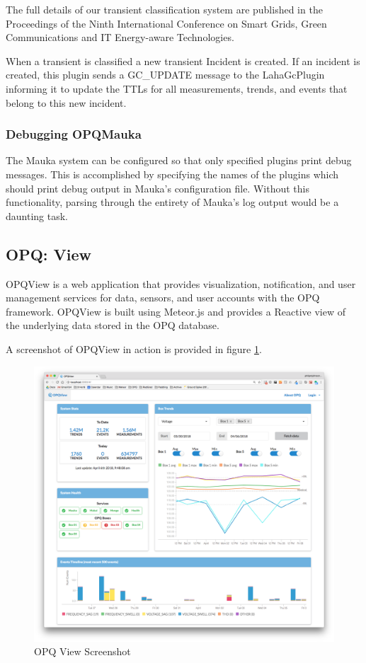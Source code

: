 The full details of our transient classification system are published in the Proceedings of the Ninth International Conference on Smart Grids, Green Communications and IT Energy-aware Technologies\cite{csdl2-19-02}.

When a transient is classified a new transient Incident is created. If an incident is created, this plugin sends a GC\_UPDATE message to the LahaGcPlugin informing it to update the TTLs for all measurements, trends, and events that belong to this new incident.

\subsubsection{Debugging OPQMauka}
The Mauka system can be configured so that only specified plugins print debug messages. This is accomplished by specifying the names of the plugins which should print debug output in Mauka's configuration file. Without this functionality, parsing through the entirety of Mauka's log output would be a daunting task.

\subsection{OPQ: View}
OPQView is a web application that provides visualization, notification, and user management services for data, sensors, and user accounts with the OPQ framework. OPQView is built using Meteor.js and provides a Reactive view of the underlying data stored in the OPQ database.

A screenshot of OPQView in action is provided in figure \ref{fig:opq-view}.

\begin{figure}
	\centering
	\includegraphics[width=1\linewidth]{figures/opqview-landing-page.png}
	\caption{OPQ View Screenshot}\label{fig:opq-view}
\end{figure}



